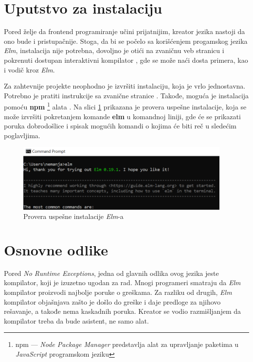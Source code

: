 \documentclass[12pt,oneside]{memoir}
\begin{document}
\section{Uputstvo za instalaciju}
Pored želje da frontend programiranje učini prijatnijim, kreator jezika nastoji 
da ono bude i pristupačnije. Stoga, da bi se počelo sa korišćenjem progamskog jezika \emph{Elm}, instalacija
nije potrebna, dovoljno je otići na zvaničnu veb stranicu i pokrenuti dostupan 
interaktivni kompilator \cite{tryelm}, gde se može naći dosta primera, kao i vodič kroz \emph{Elm}.

Za zahtevnije projekte neophodno je izvršiti instalaciju, koja je vrlo
jednostavna. Potrebno je pratiti instrukcije sa zvanične stranice
\cite{installelm}. Takođe, moguća je instalacija pomoću \textbf{npm}
\footnote{npm --- \emph{Node Package Manager} predstavlja alat za upravljanje paketima u 
\emph{JavaScript} programskom jeziku} alata \cite{npm}.
Na slici \ref{fig:elm-cmd} prikazana je provera uspešne instalacije, koja se može izvršiti
pokretanjem komande \textbf{elm} u komandnoj liniji, gde će se prikazati poruka
dobrodošlice i spisak mogućih komandi o kojima će biti reč u sledećim poglavljima.
\begin{figure}[!ht]
  \centering
  \includegraphics[width=0.95\textwidth]{elm-cmd.png}
  \caption{Provera uspešne instalacije \emph{Elm}-a}
  \label{fig:elm-cmd}
\end{figure}

\section{Osnovne odlike}
Pored \emph{No Runtime Exceptions}, jedna od glavnih odlika ovog jezika jeste
kompilator, koji je izuzetno ugodan za rad. Mnogi programeri smatraju da \emph{Elm}
kompilator proizvodi najbolje poruke o greškama. Za razliku od drugih, \emph{Elm}
kompilator objašnjava zašto je došlo do greške i daje predloge za njihovo rešavanje,
a takođe nema kaskadnih poruka. Kreator se vodio razmišljanjem da kompilator treba
da bude asistent, ne samo alat.
\end{document}

